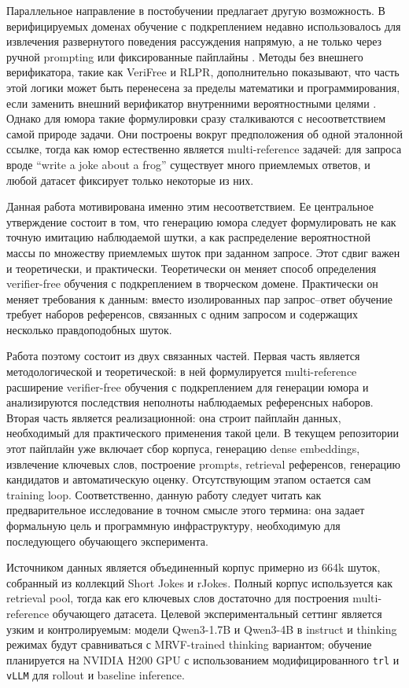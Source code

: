 Параллельное направление в постобучении предлагает другую возможность. В верифицируемых доменах обучение с подкреплением недавно использовалось для извлечения развернутого поведения рассуждения напрямую, а не только через ручной prompting или фиксированные пайплайны \citep{Lightman2023,DeepSeek2025}. Методы без внешнего верификатора, такие как VeriFree и RLPR, дополнительно показывают, что часть этой логики может быть перенесена за пределы математики и программирования, если заменить внешний верификатор внутренними вероятностными целями \citep{Zhou2025,Yu2025}. Однако для юмора такие формулировки сразу сталкиваются с несоответствием самой природе задачи. Они построены вокруг предположения об одной эталонной ссылке, тогда как юмор естественно является multi-reference задачей: для запроса вроде ``write a joke about a frog'' существует много приемлемых ответов, и любой датасет фиксирует только некоторые из них.

Данная работа мотивирована именно этим несоответствием. Ее центральное утверждение состоит в том, что генерацию юмора следует формулировать не как точную имитацию наблюдаемой шутки, а как распределение вероятностной массы по множеству приемлемых шуток при заданном запросе. Этот сдвиг важен и теоретически, и практически. Теоретически он меняет способ определения verifier-free обучения с подкреплением в творческом домене. Практически он меняет требования к данным: вместо изолированных пар запрос--ответ обучение требует наборов референсов, связанных с одним запросом и содержащих несколько правдоподобных шуток.

Работа поэтому состоит из двух связанных частей. Первая часть является методологической и теоретической: в ней формулируется multi-reference расширение verifier-free обучения с подкреплением для генерации юмора и анализируются последствия неполноты наблюдаемых референсных наборов. Вторая часть является реализационной: она строит пайплайн данных, необходимый для практического применения такой цели. В текущем репозитории этот пайплайн уже включает сбор корпуса, генерацию dense embeddings, извлечение ключевых слов, построение prompts, retrieval референсов, генерацию кандидатов и автоматическую оценку. Отсутствующим этапом остается сам training loop. Соответственно, данную работу следует читать как предварительное исследование в точном смысле этого термина: она задает формальную цель и программную инфраструктуру, необходимую для последующего обучающего эксперимента.

Источником данных является объединенный корпус примерно из 664k шуток, собранный из коллекций Short Jokes и rJokes. Полный корпус используется как retrieval pool, тогда как его ключевых слов достаточно для построения multi-reference обучающего датасета. Целевой экспериментальный сеттинг является узким и контролируемым: модели Qwen3-1.7B и Qwen3-4B в instruct и thinking режимах будут сравниваться с MRVF-trained thinking вариантом; обучение планируется на NVIDIA H200 GPU с использованием модифицированного \texttt{trl} и \texttt{vLLM} для rollout и baseline inference.
